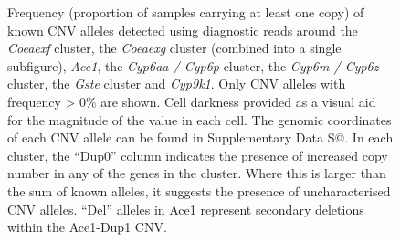 \documentclass[a4paper,12pt]{article}
\begin{document}
\clearpage


\begin{figure}[h]
	\begin{center}
		\vskip 0.4cm
		\vskip 0.4cm
		\vskip 0.4cm
		\vskip 0.4cm
		\vskip 0.4cm
	\end{center}
	\caption{\footnotesize Frequency (proportion of samples carrying at least one copy) of known CNV alleles detected using diagnostic reads around the \textit{Coeaexf} cluster, the \textit{Coeaexg} cluster (combined into a single subfigure), \textit{Ace1}, the \textit{Cyp6aa / Cyp6p} cluster, the \textit{Cyp6m / Cyp6z} cluster, the \textit{Gste} cluster and \textit{Cyp9k1}. Only CNV alleles with frequency > 0\% are shown. Cell darkness provided as a visual aid for the magnitude of the value in each cell. The genomic coordinates of each CNV allele can be found in Supplementary Data S@. In each cluster, the ``Dup0'' column indicates the presence of increased copy number in any of the genes in the cluster. Where this is larger than the sum of known alleles, it suggests the presence of uncharacterised CNV alleles. ``Del'' alleles in Ace1 represent secondary deletions within the Ace1-Dup1 CNV.}
	\label{FigS3}
\end{figure}
\end{document}
